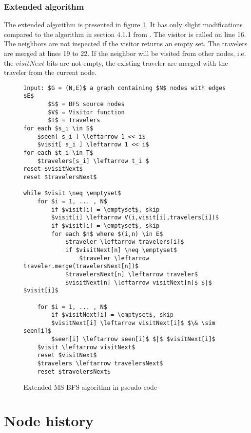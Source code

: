 \subsubsection{Extended algorithm}

The extended algorithm is presented in figure \ref{fig:extended_ms-bfs_algorithm}. It has only slight modifications compared to the algorithm in section 4.1.1 from \cite{msbfs}. The visitor is called on line 16. The neighbors are not inspected if the visitor returns an empty set. The travelers are merged at lines 19 to 22. If the neighbor will be visited from other nodes, i.e. the $visitNext$ bits are not empty, the existing traveler are merged with the traveler from the current node.

\begin{figure}[h]
    \begin{lstlisting}[mathescape]
Input: $G = (N,E)$ a graph containing $N$ nodes with edges $E$
       $S$ = BFS source nodes
       $V$ = Visitor function
       $T$ = Travelers
for each $s_i \in S$
    $seen[ s_i ] \leftarrow 1 << i$
    $visit[ s_i ] \leftarrow 1 << i$
for each $t_i \in T$
    $travelers[s_i] \leftarrow t_i $
reset $visitNext$
reset $travelersNext$

while $visit \neq \emptyset$
    for $i = 1, ... , N$
        if $visit[i] = \emptyset$, skip
        $visit[i] \leftarrow V(i,visit[i],travelers[i])$
        if $visit[i] = \emptyset$, skip
        for each $n$ where $(i,n) \in E$
            $traveler \leftarrow travelers[i]$
            if $visitNext[n] \neq \emptyset$
                $traveler \leftarrow traveler.merge(travelersNext[n])$
            $travelersNext[n] \leftarrow traveler$
            $visitNext[n] \leftarrow visitNext[n]$ $|$ $visit[i]$

    for $i = 1, ... , N$
        if $visitNext[i] = \emptyset$, skip
        $visitNext[i] \leftarrow visitNext[i]$ $\& \sim seen[i]$
        $seen[i] \leftarrow seen[i]$ $|$ $visitNext[i]$
    $visit \leftarrow visitNext$
    reset $visitNext$
    $travelers \leftarrow travelersNext$
    reset $travelersNext$
    \end{lstlisting}
    \caption{Extended MS-BFS algorithm in pseudo-code}
    \label{fig:extended_ms-bfs_algorithm}
\end{figure}


\section{Node history}

